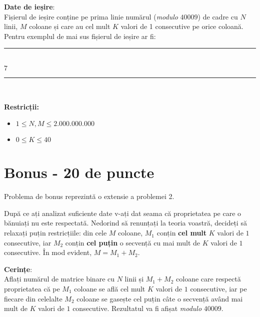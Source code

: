 \documentclass[a4paper,5pt]{article}
\begin{document}
\textbf{Date de ieșire}: \\
Fișierul de ieșire conține pe prima linie numărul (\textit{modulo} $40009$) de
cadre cu $N$ linii, $M$ coloane și care au cel mult $K$ valori de 1 consecutive
pe orice coloană.
Pentru exemplul de mai sus fișierul de ieșire ar fi:\\
\rule{50mm}{0.1mm}\\
\noindent
$7$\\
\rule{50mm}{0.1mm}\\
\indent

\textbf{Restricții:}
\begin{itemize}
\item $1 \le N, M \le 2.000.000.000$
\item $0 \le K \le 40$
\end{itemize}

\section{Bonus - 20 de puncte}
Problema de bonus reprezintă o extensie a problemei 2.

După ce ați analizat suficiente date v-ați dat seama că proprietatea pe care o
bănuiați nu este respectată. Nedorind să renunțați la teoria voastră, decideți
să relaxați puțin restricțiile:  din cele $M$ coloane, $M_1$ conțin \textbf{cel mult}
$K$ valori de $1$ consecutive, iar $M_2$ conțin \textbf{cel puțin} o secvență cu mai
mult de $K$ valori de $1$ consecutive. În mod evident, $M = M_1 + M_2$.

\textbf{Cerințe}: \\
Aflați numărul de matrice binare cu $N$ linii și $M_1 + M_2$ coloane care
respectă proprietatea că pe $M_1$ coloane se află cel mult $K$ valori de $1$
consecutive, iar pe fiecare din celelalte $M_2$ coloane se gasește cel puțin
câte  o secvență având mai mult de $K$ valori de $1$ consecutive. Rezultatul va
fi afișat \textit{modulo} $40009$.
\end{document}
